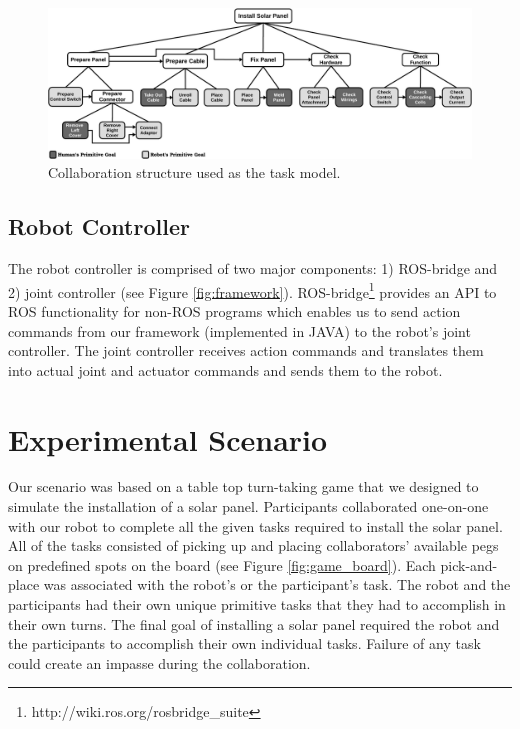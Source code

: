 \documentclass[12pt]{report}
\begin{document}
\begin{figure}[tbh]
  \centering
  \includegraphics[width=1\textwidth]{figure/collaborationStructure.pdf}
  \caption{{\fontsize{10}{10}\selectfont Collaboration structure used as the
  task model.}}
  \label{fig:collaboration_structure}
\end{figure}

\subsection{Robot Controller}
The robot controller is comprised of two major components: 1) ROS-bridge and 2)
joint controller (see Figure \ref{fig:framework}).
ROS-bridge\footnote{http://wiki.ros.org/rosbridge\_suite} provides an API to ROS
functionality for non-ROS programs which enables us to send action commands from
our framework (implemented in JAVA) to the robot's joint controller. The joint
controller receives action commands and translates them into actual joint and
actuator commands and sends them to the robot.

\section{Experimental Scenario}

Our scenario was based on a table top turn-taking game that we designed to
simulate the installation of a solar panel. Participants collaborated one-on-one
with our robot to complete all the given tasks required to install the solar
panel. All of the tasks consisted of picking up and placing collaborators'
available pegs on predefined spots on the board (see Figure
\ref{fig:game_board}). Each pick-and-place was associated with the robot's or
the participant's task. The robot and the participants had their own unique
primitive tasks that they had to accomplish in their own turns. The final goal
of installing a solar panel required the robot and the participants to
accomplish their own individual tasks. Failure of any task could create an
impasse during the collaboration.
\end{document}

